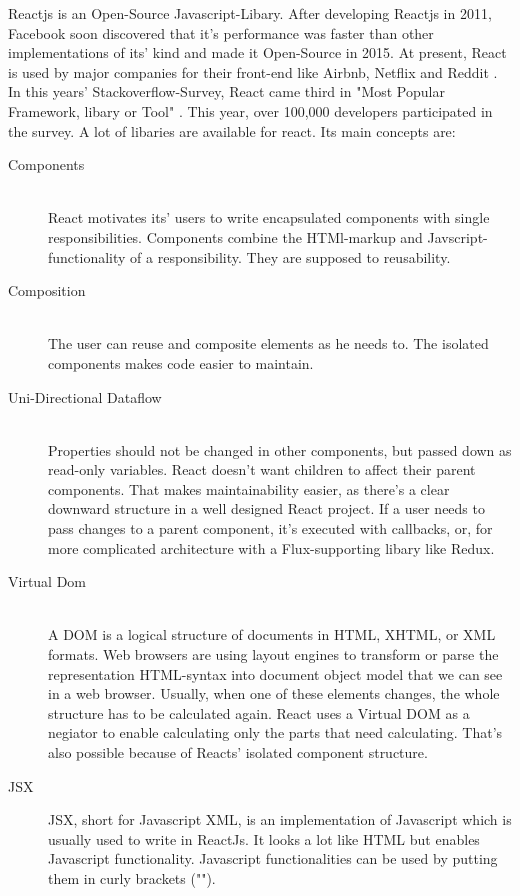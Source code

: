 Reactjs is an Open-Source Javascript-Libary.
After developing Reactjs in 2011, Facebook soon discovered that it's performance was faster than other implementations of its' kind and made it Open-Source in 2015. 
At present, React is used by major companies for their front-end like Airbnb, Netflix and Reddit \parencite{reactjsUsers}. 
In this years' Stackoverflow-Survey, React came third in "Most Popular Framework, libary or Tool" \parencite{stackOverflowSurvey}. 
This year, over 100,000 developers participated in the survey. 
A lot of libaries are available for react. 
Its main concepts are:
\begin{description}
    \item[Components] \hfill \\
    React motivates its' users to write encapsulated components with single responsibilities. Components combine the HTMl-markup and Javscript-functionality of a responsibility. They are supposed to reusability. %
    \item[Composition] \hfill \\
    The user can reuse and composite elements as he needs to. The isolated components makes code easier to maintain. 
    \item[Uni-Directional Dataflow] \hfill \\
            Properties should not be changed in other components, but passed down as read-only variables. 
            React doesn't want children to affect their parent components. That makes maintainability easier, as there's a clear downward structure in a well designed React project.
            If a user needs to pass changes to a parent component, it's executed with callbacks, or, for more complicated architecture with a Flux-supporting libary like Redux.
    \item[Virtual Dom]\hfill \\
    A DOM%
    is a logical structure of documents in HTML, XHTML, or XML formats. 
    Web browsers are using layout engines to transform or parse the representation HTML-syntax into document object model that we can see in a web browser.
    Usually, when one of these elements changes, the whole structure has to be calculated again. 
    React uses a Virtual DOM as a negiator to enable calculating only the parts that need calculating. That's also possible because of Reacts' isolated component structure.
    \item[JSX]  JSX, short for Javascript XML, is an implementation of Javascript which is usually used to write in ReactJs. 
    It looks a lot like HTML but enables Javascript functionality. Javascript functionalities can be used by putting them in curly brackets ("{}").
\end{description}
